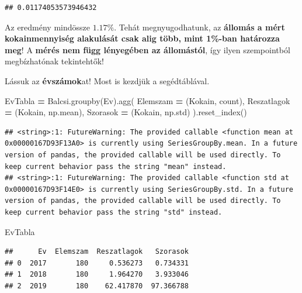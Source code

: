 \documentclass[
]{book}
\newenvironment{Shaded}{\begin{snugshade}}{\end{snugshade}}
\newcommand{\NormalTok}[1]{#1}
\newcommand{\OperatorTok}[1]{\textcolor[rgb]{0.81,0.36,0.00}{\textbf{#1}}}
\newcommand{\StringTok}[1]{\textcolor[rgb]{0.31,0.60,0.02}{#1}}
\begin{document}
\begin{verbatim}
## 0.01174053573946432
\end{verbatim}

Az eredmény mindössze \(1.17\%\). Tehát megnyugodhatunk, az \textbf{állomás a mért kokainmennyiség alakulását csak alig több, mint 1\%-ban határozza meg}! A \textbf{mérés nem függ lényegében az állomástól}, így ilyen szempointból megbízhatónak tekintehtők!

Lássuk az \textbf{évszámok}at! Most is kezdjük a segédtáblával.

\begin{Shaded}
\begin{Highlighting}[]
\NormalTok{EvTabla }\OperatorTok{=}\NormalTok{ Balcsi.groupby(}\StringTok{\textquotesingle{}Ev\textquotesingle{}}\NormalTok{).agg(}
\NormalTok{  Elemszam }\OperatorTok{=}\NormalTok{ (}\StringTok{\textquotesingle{}Kokain\textquotesingle{}}\NormalTok{, }\StringTok{\textquotesingle{}count\textquotesingle{}}\NormalTok{),}
\NormalTok{  Reszatlagok }\OperatorTok{=}\NormalTok{ (}\StringTok{\textquotesingle{}Kokain\textquotesingle{}}\NormalTok{, np.mean),}
\NormalTok{  Szorasok }\OperatorTok{=}\NormalTok{ (}\StringTok{\textquotesingle{}Kokain\textquotesingle{}}\NormalTok{, np.std)}
\NormalTok{).reset\_index()}
\end{Highlighting}
\end{Shaded}

\begin{verbatim}
## <string>:1: FutureWarning: The provided callable <function mean at 0x00000167D93F13A0> is currently using SeriesGroupBy.mean. In a future version of pandas, the provided callable will be used directly. To keep current behavior pass the string "mean" instead.
## <string>:1: FutureWarning: The provided callable <function std at 0x00000167D93F14E0> is currently using SeriesGroupBy.std. In a future version of pandas, the provided callable will be used directly. To keep current behavior pass the string "std" instead.
\end{verbatim}

\begin{Shaded}
\begin{Highlighting}[]
\NormalTok{EvTabla}
\end{Highlighting}
\end{Shaded}

\begin{verbatim}
##      Ev  Elemszam  Reszatlagok   Szorasok
## 0  2017       180     0.536273   0.734331
## 1  2018       180     1.964270   3.933046
## 2  2019       180    62.417870  97.366788
\end{verbatim}
\end{document}

